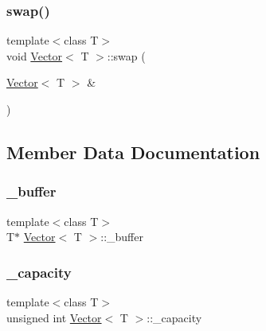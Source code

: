 \mbox{\label{classVector_a8000ae0fa6fb99c008b04fa7b07e40a1_a8000ae0fa6fb99c008b04fa7b07e40a1}} 
\subsubsection{\texorpdfstring{swap()}{swap()}}
{\footnotesize\ttfamily template$<$class T$>$ \\
void \hyperlink{classVector}{Vector}$<$ T $>$\+::swap (\begin{DoxyParamCaption}\item[{\hyperlink{classVector}{Vector}$<$ T $>$ \&}]{ }\end{DoxyParamCaption})}



\subsection{Member Data Documentation}
\mbox{\label{classVector_a558d102b492fda3e325fddd1eb1b0266_a558d102b492fda3e325fddd1eb1b0266}} 
\subsubsection{\texorpdfstring{\+\_\+buffer}{\_buffer}}
{\footnotesize\ttfamily template$<$class T$>$ \\
T$\ast$ \hyperlink{classVector}{Vector}$<$ T $>$\+::\+\_\+buffer\hspace{0.3cm}{\ttfamily [private]}}

\mbox{\label{classVector_a0c81b0e0d635e46bb65f05c6f12e08e8_a0c81b0e0d635e46bb65f05c6f12e08e8}} 
\subsubsection{\texorpdfstring{\+\_\+capacity}{\_capacity}}
{\footnotesize\ttfamily template$<$class T$>$ \\
unsigned int \hyperlink{classVector}{Vector}$<$ T $>$\+::\+\_\+capacity\hspace{0.3cm}{\ttfamily [private]}}

